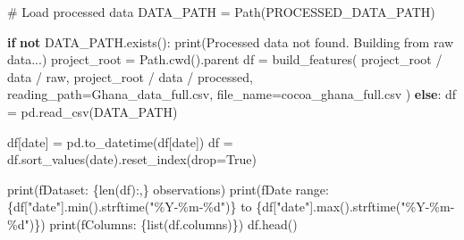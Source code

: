 \documentclass[
  letterpaper,
  DIV=11,
  numbers=noendperiod]{scrartcl}
\newenvironment{Shaded}{\begin{snugshade}}{\end{snugshade}}
\newcommand{\BuiltInTok}[1]{\textcolor[rgb]{0.00,0.23,0.31}{#1}}
\newcommand{\CommentTok}[1]{\textcolor[rgb]{0.37,0.37,0.37}{#1}}
\newcommand{\ControlFlowTok}[1]{\textcolor[rgb]{0.00,0.23,0.31}{\textbf{#1}}}
\newcommand{\KeywordTok}[1]{\textcolor[rgb]{0.00,0.23,0.31}{\textbf{#1}}}
\newcommand{\NormalTok}[1]{\textcolor[rgb]{0.00,0.23,0.31}{#1}}
\newcommand{\OperatorTok}[1]{\textcolor[rgb]{0.37,0.37,0.37}{#1}}
\newcommand{\SpecialCharTok}[1]{\textcolor[rgb]{0.37,0.37,0.37}{#1}}
\newcommand{\SpecialStringTok}[1]{\textcolor[rgb]{0.13,0.47,0.30}{#1}}
\newcommand{\StringTok}[1]{\textcolor[rgb]{0.13,0.47,0.30}{#1}}
\newcommand{\VariableTok}[1]{\textcolor[rgb]{0.07,0.07,0.07}{#1}}
\begin{document}
\begin{Shaded}
\begin{Highlighting}[]
\CommentTok{\# Load processed data}
\NormalTok{DATA\_PATH }\OperatorTok{=}\NormalTok{ Path(PROCESSED\_DATA\_PATH)}

\ControlFlowTok{if} \KeywordTok{not}\NormalTok{ DATA\_PATH.exists():}
    \BuiltInTok{print}\NormalTok{(}\StringTok{\textquotesingle{}Processed data not found. Building from raw data...\textquotesingle{}}\NormalTok{)}
\NormalTok{    project\_root }\OperatorTok{=}\NormalTok{ Path.cwd().parent}
\NormalTok{    df }\OperatorTok{=}\NormalTok{ build\_features(}
\NormalTok{        project\_root }\OperatorTok{/} \StringTok{\textquotesingle{}data\textquotesingle{}} \OperatorTok{/} \StringTok{\textquotesingle{}raw\textquotesingle{}}\NormalTok{,}
\NormalTok{        project\_root }\OperatorTok{/} \StringTok{\textquotesingle{}data\textquotesingle{}} \OperatorTok{/} \StringTok{\textquotesingle{}processed\textquotesingle{}}\NormalTok{,}
\NormalTok{        reading\_path}\OperatorTok{=}\StringTok{\textquotesingle{}Ghana\_data\_full.csv\textquotesingle{}}\NormalTok{,}
\NormalTok{        file\_name}\OperatorTok{=}\StringTok{\textquotesingle{}cocoa\_ghana\_full.csv\textquotesingle{}}
\NormalTok{    )}
\ControlFlowTok{else}\NormalTok{:}
\NormalTok{    df }\OperatorTok{=}\NormalTok{ pd.read\_csv(DATA\_PATH)}

\NormalTok{df[}\StringTok{\textquotesingle{}date\textquotesingle{}}\NormalTok{] }\OperatorTok{=}\NormalTok{ pd.to\_datetime(df[}\StringTok{\textquotesingle{}date\textquotesingle{}}\NormalTok{])}
\NormalTok{df }\OperatorTok{=}\NormalTok{ df.sort\_values(}\StringTok{\textquotesingle{}date\textquotesingle{}}\NormalTok{).reset\_index(drop}\OperatorTok{=}\VariableTok{True}\NormalTok{)}

\BuiltInTok{print}\NormalTok{(}\SpecialStringTok{f\textquotesingle{}Dataset: }\SpecialCharTok{\{}\BuiltInTok{len}\NormalTok{(df)}\SpecialCharTok{:,\}}\SpecialStringTok{ observations\textquotesingle{}}\NormalTok{)}
\BuiltInTok{print}\NormalTok{(}\SpecialStringTok{f\textquotesingle{}Date range: }\SpecialCharTok{\{}\NormalTok{df[}\StringTok{"date"}\NormalTok{]}\SpecialCharTok{.}\BuiltInTok{min}\NormalTok{()}\SpecialCharTok{.}\NormalTok{strftime(}\StringTok{"\%Y{-}\%m{-}}\SpecialCharTok{\%d}\StringTok{"}\NormalTok{)}\SpecialCharTok{\}}\SpecialStringTok{ to }\SpecialCharTok{\{}\NormalTok{df[}\StringTok{"date"}\NormalTok{]}\SpecialCharTok{.}\BuiltInTok{max}\NormalTok{()}\SpecialCharTok{.}\NormalTok{strftime(}\StringTok{"\%Y{-}\%m{-}}\SpecialCharTok{\%d}\StringTok{"}\NormalTok{)}\SpecialCharTok{\}}\SpecialStringTok{\textquotesingle{}}\NormalTok{)}
\BuiltInTok{print}\NormalTok{(}\SpecialStringTok{f\textquotesingle{}Columns: }\SpecialCharTok{\{}\BuiltInTok{list}\NormalTok{(df.columns)}\SpecialCharTok{\}}\SpecialStringTok{\textquotesingle{}}\NormalTok{)}
\NormalTok{df.head()}
\end{Highlighting}
\end{Shaded}
\end{document}
